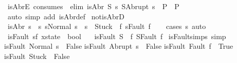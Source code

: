 \begin{isabellebody}
\ isAbrE\ {\isacharbrackleft}consumes\ {}{\isacharcomma}\ elim{\isacharquery}{\isacharbrackright}{\isacharcolon}\ {\isachardoublequoteopen}{\isasymlbrakk}isAbr\ S{\isacharsemicolon}\ {\isasymAnd}s{\isachardot}\ S{\isacharequal}Abrupt\ s\ {\isasymLongrightarrow}\ P{\isasymrbrakk}\ {\isasymLongrightarrow}\ P{\isachardoublequoteclose}\isanewline
%
\isadelimproof
\ \ %
\endisadelimproof
%
\isatagproof
{}\isamarkupfalse%
\ {\isacharparenleft}auto\ simp\ add{\isacharcolon}\ isAbr{\isacharunderscore}def{\isacharparenright}%
\endisatagproof
{\isafoldproof}%
%
\isadelimproof
\isanewline
%
\endisadelimproof
\isanewline
{}\isamarkupfalse%
\ not{\isacharunderscore}isAbrD{\isacharcolon}\ \isanewline
{\isachardoublequoteopen}{\isasymnot}\ isAbr\ s\ {\isasymLongrightarrow}\ {\isacharparenleft}{\isasymexists}s{\isacharprime}{\isachardot}\ s{\isacharequal}Normal\ s{\isacharprime}{\isacharparenright}\ {\isasymor}\ s\ {\isacharequal}\ Stuck\ {\isasymor}\ {\isacharparenleft}{\isasymexists}f{\isachardot}\ s{\isacharequal}Fault\ f{\isacharparenright}{\isachardoublequoteclose}\isanewline
%
\isadelimproof
\ \ %
\endisadelimproof
%
\isatagproof
{}\isamarkupfalse%
\ {\isacharparenleft}cases\ s{\isacharparenright}\ auto%
\endisatagproof
{\isafoldproof}%
%
\isadelimproof
\isanewline
%
\endisadelimproof
\isanewline
{}\isamarkupfalse%
\ isFault{\isacharcolon}{\isacharcolon}\ {\isachardoublequoteopen}{\isacharparenleft}{\isacharprime}s{\isacharcomma}{\isacharprime}f{\isacharparenright}\ xstate\ {\isasymRightarrow}\ bool{\isachardoublequoteclose}\isanewline
\ \ \ {\isachardoublequoteopen}isFault\ S\ {\isacharequal}\ {\isacharparenleft}{\isasymexists}f{\isachardot}\ S{\isacharequal}Fault\ f{\isacharparenright}{\isachardoublequoteclose}\isanewline
\isanewline
{}\isamarkupfalse%
\ isFault{\isacharunderscore}simps\ {\isacharbrackleft}simp{\isacharbrackright}{\isacharcolon}\isanewline
{\isachardoublequoteopen}isFault\ {\isacharparenleft}Normal\ s{\isacharparenright}\ {\isacharequal}\ False{\isachardoublequoteclose}\isanewline
{\isachardoublequoteopen}isFault\ {\isacharparenleft}Abrupt\ s{\isacharparenright}\ {\isacharequal}\ False{\isachardoublequoteclose}\isanewline
{\isachardoublequoteopen}isFault\ {\isacharparenleft}Fault\ f{\isacharparenright}\ {\isacharequal}\ True{\isachardoublequoteclose}\isanewline
{\isachardoublequoteopen}isFault\ Stuck\ {\isacharequal}\ False{\isachardoublequoteclose}\isanewline
%
\isadelimproof
%
\endisadelimproof
%
\isatagproof
{}\isamarkupfalse%

\end{isabellebody}
